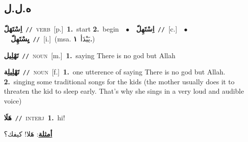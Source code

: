 \documentclass[10pt,a4paper,twoside]{article} %
\begin{document}
\begin{multicols}{2}
\vspace{-3mm}
\subsection*{\color{blue}\foreignlanguage{arabic}{ه.ل.ل}\color{blue}{}} 

{\setlength\topsep{0pt}\textbf{\foreignlanguage{arabic}{اِسْتَهَلّ}}\ {\color{gray}\texttt{//}\color{black}}\ \textsc{verb}\ [p.]\ \textbf{1.}~start  \textbf{2.}~begin\ \ $\bullet$\ \ \setlength\topsep{0pt}\textbf{\foreignlanguage{arabic}{اِسْتَهِلّ}}\ {\color{gray}\texttt{//}\color{black}}\ [c.]\ \ $\bullet$\ \ \setlength\topsep{0pt}\textbf{\foreignlanguage{arabic}{يِسْتَهِلّ}}\ {\color{gray}\texttt{//}\color{black}}\ [i.]\ \color{gray}(msa. \foreignlanguage{arabic}{يَبْدَأ}~\foreignlanguage{arabic}{\textbf{١.}})\color{black}\ } \vspace{2mm}

{\setlength\topsep{0pt}\textbf{\foreignlanguage{arabic}{تَهْلِيل}}\ {\color{gray}\texttt{//}\color{black}}\ \textsc{noun}\ [m.]\ \textbf{1.}~saying There is no god but Allah\ } \vspace{2mm}

{\setlength\topsep{0pt}\textbf{\foreignlanguage{arabic}{تَهْلِيلِة}}\ {\color{gray}\texttt{//}\color{black}}\ \textsc{noun}\ [f.]\ \textbf{1.}~one utterence of saying There is no god but Allah.  \textbf{2.}~singing some traditional songs for the kids (the mother usually does it to threaten the kid to sleep early. That's why she sings in a very loud and audible voice)\ } \vspace{2mm}

{\setlength\topsep{0pt}\textbf{\foreignlanguage{arabic}{هَلَا}}\ {\color{gray}\texttt{//}\color{black}}\ \textsc{interj}\ \textbf{1.}~hi!\  \begin{flushright}\color{gray}\foreignlanguage{arabic}{\textbf{\underline{\foreignlanguage{arabic}{أمثلة}}}: هَلا! كيفك؟}\end{flushright}\color{black}} \vspace{2mm}


\end{multicols}
\end{document}
